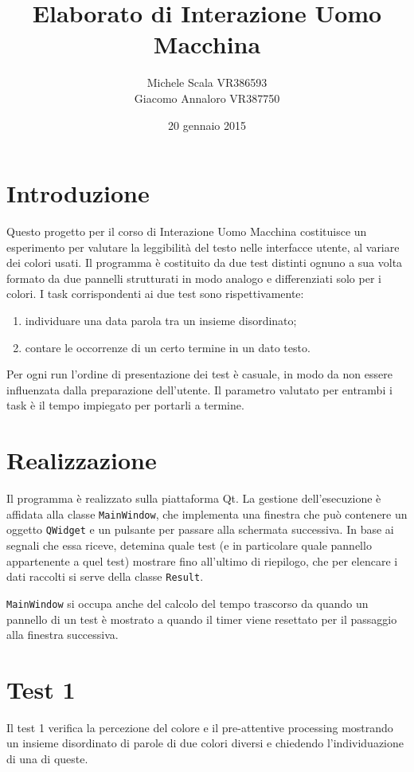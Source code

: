 \documentclass[a4paper]{article}
\begin{document}
\title{Elaborato di Interazione Uomo Macchina}
\author{Michele Scala VR386593 \\ Giacomo Annaloro VR387750}
\date{20 gennaio 2015}
\maketitle


\section{Introduzione}
Questo progetto per il corso di Interazione Uomo Macchina costituisce un esperimento per valutare la leggibilità del testo nelle interfacce utente, al variare dei colori usati. Il programma è costituito da due test distinti ognuno a sua volta formato da due pannelli strutturati in modo analogo e differenziati solo per i colori.
I task corrispondenti ai due test sono rispettivamente:
\begin{enumerate}
\item individuare una data parola tra un insieme disordinato;
\item contare le occorrenze di un certo termine in un dato testo.
\end{enumerate}
Per ogni run l'ordine di presentazione dei test è casuale, in modo da non essere influenzata dalla preparazione dell'utente. 
Il parametro valutato per entrambi i task è il tempo impiegato per portarli a termine.

\section{Realizzazione}
Il programma è realizzato sulla piattaforma Qt. 
La gestione dell'esecuzione è affidata alla classe \verb:MainWindow:, che implementa una finestra che può contenere un oggetto \verb:QWidget: e un pulsante per passare alla schermata successiva. In base ai segnali che essa riceve, detemina quale test (e in particolare quale pannello appartenente a quel test) mostrare fino all'ultimo di riepilogo, che per elencare i dati raccolti si serve della classe \verb:Result:.

\verb:MainWindow: si occupa anche del calcolo del tempo trascorso da quando un pannello di un test è mostrato a quando il timer viene resettato per il passaggio alla finestra successiva.

\pagebreak

\section{Test 1}
Il test 1 verifica la percezione del colore e il pre-attentive processing mostrando un insieme disordinato di parole di due colori diversi e chiedendo l'individuazione di una di queste.
\end{document}
